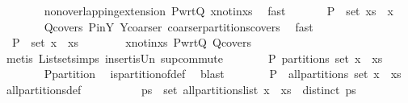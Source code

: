 \begin{isabellebody}
\ \ \ \ \ \ \isamarkupfalse%
\ non{\isacharunderscore}overlapping{\isacharunderscore}extension{}\ P{\isacharunderscore}wrt{\isacharunderscore}Q\ x{\isacharunderscore}notin{\isacharunderscore}xs\ \isamarkupfalse%
\ fast\isanewline
\ \ \ \ \isamarkupfalse%
\ {\isachardoublequoteopen}{\isasymUnion}\ P\ {\isacharequal}\ set\ xs\ {\isasymunion}\ {\isacharbraceleft}x{\isacharbraceright}{\isachardoublequoteclose}\isanewline
\ \ \ \ \ \ \isamarkupfalse%
\ Q{\isacharunderscore}covers\ P{\isacharunderscore}in{\isacharunderscore}Y\ Y{\isacharunderscore}coarser{\isacharprime}\ coarser{\isacharunderscore}partitions{\isacharunderscore}covers\ \isamarkupfalse%
\ fast\isanewline
\ \ \ \ \isamarkupfalse%
\ \isamarkupfalse%
\ {\isachardoublequoteopen}{\isasymUnion}\ P\ {\isacharequal}\ set\ {\isacharparenleft}x\ {\isacharhash}\ xs{\isacharparenright}{\isachardoublequoteclose}\isanewline
\ \ \ \ \ \ \isamarkupfalse%
\ x{\isacharunderscore}notin{\isacharunderscore}xs\ P{\isacharunderscore}wrt{\isacharunderscore}Q\ Q{\isacharunderscore}covers\isanewline
\ \ \ \ \ \ \isamarkupfalse%
\ {\isacharparenleft}metis\ List{\isachardot}set{\isacharunderscore}simps{\isacharparenleft}{}{\isacharparenright}\ insert{\isacharunderscore}is{\isacharunderscore}Un\ sup{\isacharunderscore}commute{\isacharparenright}\isanewline
\ \ \ \ \isamarkupfalse%
\ \isamarkupfalse%
\ {\isachardoublequoteopen}P\ partitions\ {\isacharparenleft}set\ {\isacharparenleft}x\ {\isacharhash}\ xs{\isacharparenright}{\isacharparenright}{\isachardoublequoteclose}\isanewline
\ \ \ \ \ \ \isamarkupfalse%
\ P{\isacharunderscore}partition\ \isamarkupfalse%
\ is{\isacharunderscore}partition{\isacharunderscore}of{\isacharunderscore}def\ \isamarkupfalse%
\ blast\isanewline
\ \ \ \ \isamarkupfalse%
\ \isamarkupfalse%
\ {\isachardoublequoteopen}P\ {\isasymin}\ all{\isacharunderscore}partitions\ {\isacharparenleft}set\ {\isacharparenleft}x\ {\isacharhash}\ xs{\isacharparenright}{\isacharparenright}{\isachardoublequoteclose}\ \isamarkupfalse%
\ all{\isacharunderscore}partitions{\isacharunderscore}def\ \isacommand{{\isachardot}{\isachardot}}\isamarkupfalse%
\isanewline
\ \ \isamarkupfalse%
\isanewline
\ \ \isamarkupfalse%
\ \isamarkupfalse%
\ {\isachardoublequoteopen}{\isasymforall}\ ps\ {\isasymin}\ set\ {\isacharparenleft}all{\isacharunderscore}partitions{\isacharunderscore}list\ {\isacharparenleft}x\ {\isacharhash}\ xs{\isacharparenright}{\isacharparenright}\ {\isachardot}\ distinct\ ps{\isachardoublequoteclose}\isanewline

\end{isabellebody}
